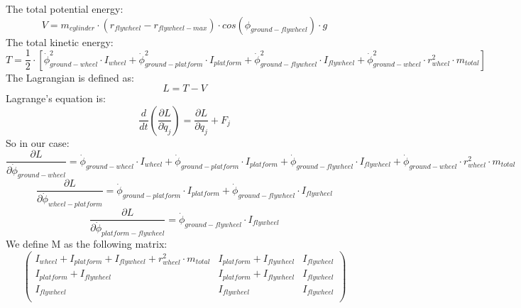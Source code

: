 The total potential energy:
\begin{equation}
	V = m_{cylinder}\cdot (r_{flywheel}-r_{flywheel-max}) \cdot cos(\phi_{ground-flywheel}) \cdot g
\end{equation}
The total kinetic energy:
\begin{equation}
	T = \frac{1}{2}\cdot[\dot{\phi}_{ground-wheel}^2\cdot I_{wheel}
		+ \dot{\phi}_{ground-platform}^2 \cdot I_{platform}
		+ \dot{\phi}_{ground-flywheel}^2\cdot I_{flywheel}
		+ \dot{\phi}_{ground-wheel}^2\cdot r_{wheel}^2\cdot m_{total}]
\end{equation}
The Lagrangian is defined as:
\begin{equation}
	L=T-V
\end{equation}
Lagrange's equation is:
\begin{equation}
	\frac{d}{dt}(\frac{\partial L}{\partial \dot{q}_j})=
	\frac{\partial L}{\partial q_j}	+ F_{j}
\end{equation}
So in our case:
\begin{equation}
	\frac{\partial L}{\partial \dot{\phi}_{ground-wheel}}=
	\dot{\phi}_{ground-wheel} \cdot I_{wheel}
	+ \dot{\phi}_{ground-platform} \cdot I_{platform}
	+ \dot{\phi}_{ground-flywheel}\cdot I_{flywheel}
	+ \dot{\phi}_{ground-wheel}\cdot r_{wheel}^2\cdot m_{total}
\end{equation}
\begin{equation}
	\frac{\partial L}{\partial \dot{\phi}_{wheel-platform}}=
	\dot{\phi}_{ground-platform} \cdot I_{platform}
	+ \dot{\phi}_{ground-flywheel}\cdot I_{flywheel}
\end{equation}
\begin{equation}
	\frac{\partial L}{\partial \dot{\phi}_{platform-flywheel}}=
	\dot{\phi}_{ground-flywheel}\cdot I_{flywheel}
\end{equation}
We define M as the following matrix:
\begin{equation}
	\begin{pmatrix}
		I_{wheel} + I_{platform} + I_{flywheel} + r_{wheel}^2 \cdot m_{total} &
		I_{platform} + I_{flywheel}                                           &
		I_{flywheel}                                                            \\
		I_{platform} + I_{flywheel}                                           &
		I_{platform} + I_{flywheel}                                           &
		I_{flywheel}                                                            \\
		I_{flywheel}                                                          &
		I_{flywheel}                                                          &
		I_{flywheel}                                                            \\
	\end{pmatrix}
\end{equation}
